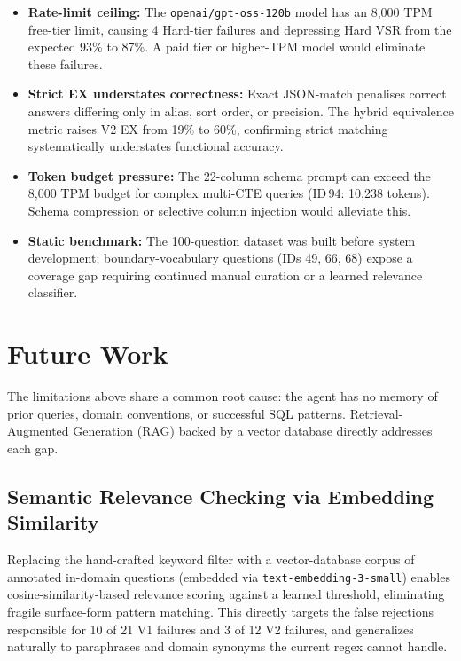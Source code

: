 \documentclass{article}
\begin{document}
\begin{itemize}
  \item \textbf{Rate-limit ceiling:} The \texttt{openai/gpt-oss-120b} model has an 8,000 TPM free-tier limit, causing 4 Hard-tier failures and depressing Hard VSR from the expected 93\% to 87\%. A paid tier or higher-TPM model would eliminate these failures.
  \item \textbf{Strict EX understates correctness:} Exact JSON-match penalises correct answers differing only in alias, sort order, or precision. The hybrid equivalence metric raises V2 EX from 19\% to 60\%, confirming strict matching systematically understates functional accuracy.
  \item \textbf{Token budget pressure:} The 22-column schema prompt can exceed the 8,000 TPM budget for complex multi-CTE queries (ID\,94: 10,238 tokens). Schema compression or selective column injection would alleviate this.
  \item \textbf{Static benchmark:} The 100-question dataset was built before system development; boundary-vocabulary questions (IDs 49, 66, 68) expose a coverage gap requiring continued manual curation or a learned relevance classifier.
\end{itemize}

\section{Future Work}

The limitations above share a common root cause: the agent has no memory of prior queries, domain conventions, or successful SQL patterns. Retrieval-Augmented Generation (RAG) \cite{lewis2020rag} backed by a vector database directly addresses each gap.

\subsection{Semantic Relevance Checking via Embedding Similarity}

Replacing the hand-crafted keyword filter with a vector-database corpus of annotated in-domain questions (embedded via \texttt{text-embedding-3-small}) enables cosine-similarity-based relevance scoring against a learned threshold, eliminating fragile surface-form pattern matching. This directly targets the false rejections responsible for 10 of 21 V1 failures and 3 of 12 V2 failures, and generalizes naturally to paraphrases and domain synonyms the current regex cannot handle.
\end{document}

